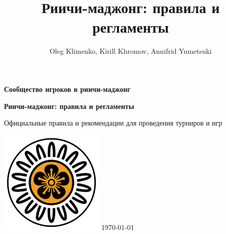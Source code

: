 \documentclass[a4paper]{article}
\author{Oleg Klimenko, Kirill Khromov, Annifrid Yumetsuki}
\title{Риичи-маджонг: правила и регламенты}
\begin{document}
	\setlength\parindent{15pt}
	\pagestyle{empty}
	\begin{center}
		\LARGE
		{\bfseries Сообщество игроков в риичи-маджонг\par}
		\vspace{4cm}
		{\huge\bfseries Риичи-маджонг: правила и регламенты\par}
		\vspace{3cm}
		\par
		
		\normalsize
		Официальные правила и рекомендации для проведения турниров и игр\par
		\vspace{5cm}
		\includegraphics[width=5cm]{logo}
		\vfill
		\today
	\end{center}
	\newpage
	
	\tableofcontents
	\newpage
	
	\pagestyle{plain}
	
	
	\newpage
	
	\newpage
	
	\newpage
	
	\newpage
	
	\newpage
	
	\newpage
	
	\newpage
	
	\newpage
	
	\newpage
	
	\newpage
	
	
\end{document}

